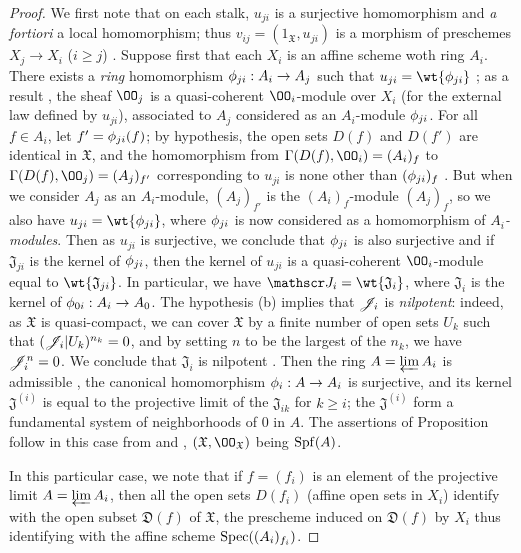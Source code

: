 \begin{proof}
\label{proof-1.10.6.3}
We first note that on each stalk, $u_{ji}$ is a surjective homomorphism and \emph{a fortiori} a local homomorphism; thus $v_{ij}=(1_\mathfrak{X},u_{ji})$ is a morphism of preschemes $X_j\to X_i$ ($i\geq j$) .
Suppose first that each $X_i$ is an affine scheme woth ring $A_i$.
There exists a \emph{ring} homomorphism $\vphi_{ji}:A_i\to A_j$ such that $u_{ji}=\wt{\vphi_{ji}}$ ; as a result , the sheaf $\OO_j$ is a quasi-coherent $\OO_i$-module over $X_i$ (for the external law defined by $u_{ji}$), associated to $A_j$ considered as an $A_i$-module $\phi_{ji}$.
For all $f\in A_i$, let $f'=\phi_{ji}(f)$; by hypothesis, the open sets $D(f)$ and $D(f')$ are identical in $\mathfrak{X}$, and the homomorphism from $\Gamma(D(f),\OO_i)=(A_i)_f$ to $\Gamma(D(f),\OO_j)=(A_j)_{f'}$ corresponding to $u_{ji}$ is none other than $(\phi_{ji})_f$ .
But when we consider $A_j$ as an $A_i$-module, $(A_j)_{f'}$ is the $(A_i)_f$-module $(A_j)_f$, so we also have $u_{ji}=\wt{\vphi_{ji}}$, where $\phi_{ji}$ is now considered as a homomorphism of \emph{$A_i$-modules}.
Then as $u_{ji}$ is surjective, we conclude that $\phi_{ji}$ is also surjective  and if $\mathfrak{J}_{ji}$ is the kernel of $\phi_{ji}$, then the kernel of $u_{ji}$ is a quasi-coherent $\OO_i$-module equal to $\wt{\mathfrak{J}_{ji}}$.
In particular, we have $\sh{J}_i=\wt{\mathfrak{J}_i}$, where $\mathfrak{J}_i$ is the kernel of $\vphi_{0i}:A_i\to A_0$.
The hypothesis (b) implies that $\mathscr{J}_i$ is \emph{nilpotent}: indeed, as $\mathfrak{X}$ is quasi-compact, we can cover $\mathfrak{X}$ by a finite number of open sets $U_k$ such that $(\mathscr{J}_i|U_k)^{n_k}=0$, and by setting $n$ to be the largest of the $n_k$, we have $\mathscr{J}_i^n=0$.
We conclude that $\mathfrak{J}_i$ is nilpotent .
Then the ring $A=\varprojlim A_i$ is admissible , the canonical homomorphism $\vphi_i:A\to A_i$ is surjective, and its kernel $\mathfrak{J}^{(i)}$ is equal to the projective limit of the $\mathfrak{J}_{ik}$ for $k\geq i$; the $\mathfrak{J}^{(i)}$ form a fundamental system of neighborhoods of $0$ in $A$.
The assertions of Proposition  follow in this case from  and , $(\mathfrak{X},\OO_\mathfrak{X})$ being $\operatorname{Spf}(A)$.

In this particular case, we note that if $f=(f_i)$ is an element of the projective limit $A=\varprojlim A_i$, then all the open sets $D(f_i)$ (affine open sets in $X_i$) identify with the open subset $\mathfrak{D}(f)$ of $\mathfrak{X}$, the prescheme induced on $\mathfrak{D}(f)$ by $X_i$ thus identifying with the affine scheme $\operatorname{Spec}((A_i)_{f_i})$.


\end{proof}
